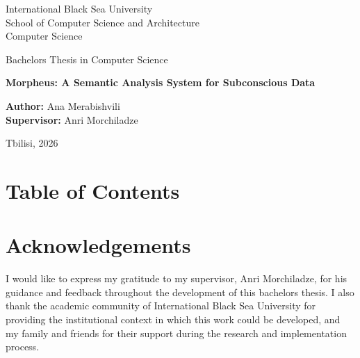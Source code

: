 \documentclass[12pt,a4paper]{report}
\makeatletter
\newcommand{\customtableofcontents}{\chapter*{Table of Contents}\@starttoc{toc}}
\makeatother
\begin{document}
\begin{titlepage}
\centering
{\large International Black Sea University\\[0.25em]School of Computer Science and Architecture\\[0.25em]Computer Science\par}
\vspace{2.5cm}
{\Large Bachelor\textquotesingle{}s Thesis in Computer Science\par}
\vspace{1.8cm}
{\bfseries\LARGE Morpheus: A Semantic Analysis System for Subconscious Data\par}
\vspace{2.2cm}
\begin{flushleft}
\hspace{2.6cm}\textbf{Author:} Ana Merabishvili\\[0.6em]
\hspace{2.6cm}\textbf{Supervisor:} Anri Morchiladze
\end{flushleft}
\vfill
{Tbilisi, 2026\par}
\end{titlepage}
\customtableofcontents
\clearpage
\chapter*{Acknowledgements}
I would like to express my gratitude to my supervisor, Anri Morchiladze, for his guidance and feedback throughout the development of this bachelor\textquotesingle{}s thesis. I also thank the academic community of International Black Sea University for providing the institutional context in which this work could be developed, and my family and friends for their support during the research and implementation process.
\end{document}
